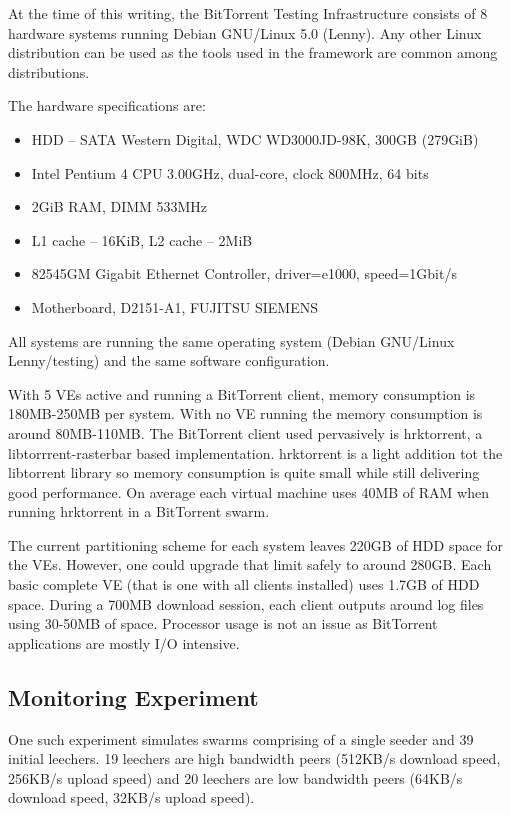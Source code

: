 At the time of this writing, the BitTorrent Testing Infrastructure consists of
8 hardware systems running Debian GNU/Linux 5.0 (Lenny). Any other Linux
distribution can be used as the tools used in the framework are common among
distributions.

The hardware specifications are:

\begin{itemize}
  \item HDD -- SATA Western Digital, WDC WD3000JD-98K, 300GB (279GiB)
  \item Intel Pentium 4 CPU 3.00GHz, dual-core, clock 800MHz, 64 bits
  \item 2GiB RAM, DIMM 533MHz
  \item L1 cache -- 16KiB, L2 cache -- 2MiB
  \item 82545GM Gigabit Ethernet Controller, driver=e1000, speed=1Gbit/s
  \item Motherboard, D2151-A1, FUJITSU SIEMENS
\end{itemize}

All systems are running the same operating system (Debian GNU/Linux
Lenny/testing) and the same software configuration.

With 5 VEs active and running a BitTorrent client, memory consumption is
180MB-250MB per system. With no VE running the memory consumption is around
80MB-110MB. The BitTorrent client used pervasively is hrktorrent, a
libtorrrent-rasterbar based implementation. hrktorrent is a light addition tot
the libtorrent library so memory consumption is quite small while still
delivering good performance. On average each virtual machine uses 40MB of RAM
when running hrktorrent in a BitTorrent swarm.

The current partitioning scheme for each system leaves 220GB of HDD space for
the VEs. However, one could upgrade that limit safely to around 280GB. Each
basic complete VE (that is one with all clients installed) uses 1.7GB of HDD
space. During a 700MB download session, each client outputs around log files
using 30-50MB of space. Processor usage is not an issue as BitTorrent
applications are mostly I/O intensive.

\subsection{Monitoring Experiment}

One such experiment simulates swarms comprising of a single seeder and 39
initial leechers. 19 leechers are high bandwidth peers (512KB/s download
speed, 256KB/s upload speed) and 20 leechers are low bandwidth peers (64KB/s
download speed, 32KB/s upload speed).

